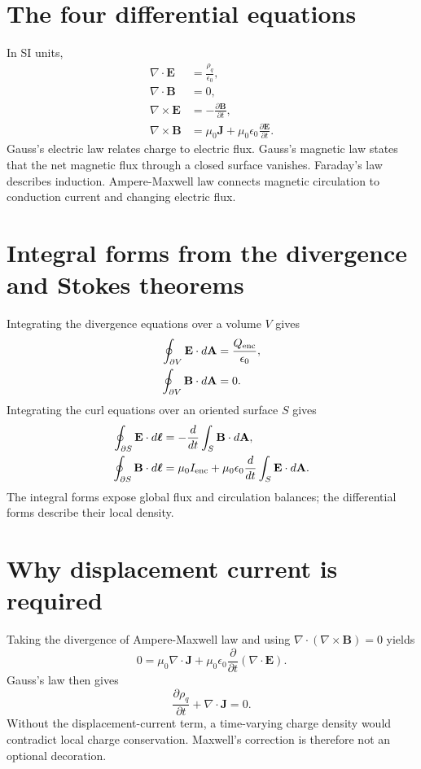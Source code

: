\documentclass[11pt]{article}
\begin{document}
\section{The four differential equations}

In SI units,
\begin{align}
\nabla\cdot\mathbf E &= \frac{\rho_q}{\epsilon_0},\\
\nabla\cdot\mathbf B &= 0,\\
\nabla\times\mathbf E &= -\frac{\partial\mathbf B}{\partial t},\\
\nabla\times\mathbf B &= \mu_0\mathbf J+\mu_0\epsilon_0\frac{\partial\mathbf E}{\partial t}.
\end{align}
Gauss's electric law relates charge to electric flux. Gauss's magnetic law states that the net magnetic flux through a closed surface vanishes. Faraday's law describes induction. Ampere-Maxwell law connects magnetic circulation to conduction current and changing electric flux.


\section{Integral forms from the divergence and Stokes theorems}

Integrating the divergence equations over a volume $V$ gives
\begin{align}
\oint_{\partial V}\mathbf E\cdot d\mathbf A &= \frac{Q_{\rm enc}}{\epsilon_0},\\
\oint_{\partial V}\mathbf B\cdot d\mathbf A &=0.
\end{align}
Integrating the curl equations over an oriented surface $S$ gives
\begin{align}
\oint_{\partial S}\mathbf E\cdot d\boldsymbol\ell
&=-\frac{d}{dt}\int_S\mathbf B\cdot d\mathbf A,\\
\oint_{\partial S}\mathbf B\cdot d\boldsymbol\ell
&=\mu_0 I_{\rm enc}+\mu_0\epsilon_0\frac{d}{dt}\int_S\mathbf E\cdot d\mathbf A.
\end{align}
The integral forms expose global flux and circulation balances; the differential forms describe their local density.


\section{Why displacement current is required}

Taking the divergence of Ampere-Maxwell law and using $\nabla\cdot(\nabla\times\mathbf B)=0$ yields
\begin{equation}
0=\mu_0\nabla\cdot\mathbf J+\mu_0\epsilon_0
\frac{\partial}{\partial t}\left(\nabla\cdot\mathbf E\right).
\end{equation}
Gauss's law then gives
\begin{equation}
\frac{\partial\rho_q}{\partial t}+\nabla\cdot\mathbf J=0.
\end{equation}
Without the displacement-current term, a time-varying charge density would contradict local charge conservation. Maxwell's correction is therefore not an optional decoration.
\end{document}
